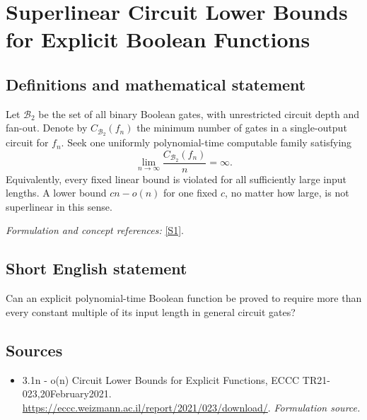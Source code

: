 \documentclass[11pt]{article}
\begin{document}
\section*{\texorpdfstring{Superlinear Circuit Lower Bounds for Explicit Boolean Functions}{Superlinear Circuit Lower Bounds for Explicit Boolean Functions}}\label{statement}
\subsection{Definitions and mathematical statement}
Let $\mathcal B_2$ be the set of all binary Boolean gates, with unrestricted circuit depth and fan-out. Denote by $C_{\mathcal B_2}(f_n)$ the minimum number of gates in a single-output circuit for $f_n$. Seek one uniformly polynomial-time computable family satisfying
\[
 \lim_{n\to\infty}\frac{C_{\mathcal B_2}(f_n)}{n}=\infty.
\]
Equivalently, every fixed linear bound is violated for all sufficiently large input lengths. A lower bound $cn-o(n)$ for one fixed $c$, no matter how large, is not superlinear in this sense.
\par\smallskip\textit{Formulation and concept references:} \href{https://eccc.weizmann.ac.il/report/2021/023/download/}{[S1]}.

\subsection{Short English statement}
Can an explicit polynomial-time Boolean function be proved to require more than every constant multiple of its input length in general circuit gates?
\subsection{Sources}
\begin{itemize}
\item[S1]3.1n - o(n) Circuit Lower Bounds for Explicit Functions, ECCC TR21-023,20February2021.
\url{https://eccc.weizmann.ac.il/report/2021/023/download/}.
\textit{Formulation source.}
\end{itemize}
\end{document}
